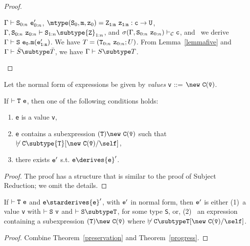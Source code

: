 \begin{proof}
\begin{itemize}
\begin{itemize}
            $\Gamma \vdash {\tt S}_{0:n} \ {\tt e}_{0:n}'$,
            $\mtype({\tt S}_0,{\tt m},{\tt z}_0) =
               \tt {\tt Z}_{1:n}\ {\tt z}_{1:n}:c \rightarrow {\tt U}$,
            $\Gamma, {\tt S}_{0:n}\ {\tt z}_{0:n} \vdash
                  {\tt S}_{1:n} \subtype {\tt Z}_{1:n}$, and
            $\sigma(\Gamma, {\tt S}_{0:n}\ {\tt z}_{0:n}) \vdash_{\cal C}
                  {\tt c}$,
            and \TInvk\ we derive
            $\Gamma \vdash {\tt S}\ {\tt e_0.m(e_{1:n}')}$.
            We have 
               $T=({\tt T}_{0:n}\ {\tt z}_{0:n}; U)$.
            From Lemma~\ref{lemmafive} and
            $\Gamma \vdash \bar{S} \subtype \bar{T}$, we have
            $\Gamma \vdash S \subtype T$.
   \end{itemize}
\end{itemize}
\end{proof}

\noindent
Let the normal form of expressions be given by {\em values}
{\tt v} {::=} $\new\ {\tt C(\bar{\tt v})}$.

\begin{theorem}[Progress] 
\label{progress}
If $\vdash {\tt T\ e}$, then one of the following conditions holds:
\begin{enumerate}
\item {\tt e} is a value {\tt v}, 
\item {\tt e} contains a subexpression ${\tt (T)\new\ C(\bar{\tt
v})}$ such that
$\not\vdash {\tt C} \subtype {\tt T}[{\tt \new\ C(\bar{\tt v})}/\self]$,
\item there exists ${\tt e}'$ s.t. ${\tt e} \derives {\tt e}'$.
\end{enumerate}
\end{theorem}

\begin{proof}
The proof has a structure that is similar to the proof of Subject Reduction;
we omit the details.
\end{proof}

\begin{theorem} 
\label{type-soundness}
If $\vdash {\tt T\ e}$ and ${\tt e} \starderives {\tt e}'$, with ${\tt
e}'$ in normal form, then ${\tt e}'$ is either (1)~a value {\tt v}
with $\vdash {\tt S\ v}$ and $\vdash {\tt S
\subtype T}$, for some type {\tt S}, or, (2)~ an expression containing
a subexpression ${\tt (T)\new\ {\tt C(\bar{\tt v})}}$ where 
$\not\vdash \tt C\subtype T[\new\ C(\bar{\tt v})/\self]$.

\end{theorem}

\begin{proof}
Combine Theorem~\ref{preservation} and Theorem~\ref{progress}.
\end{proof}

